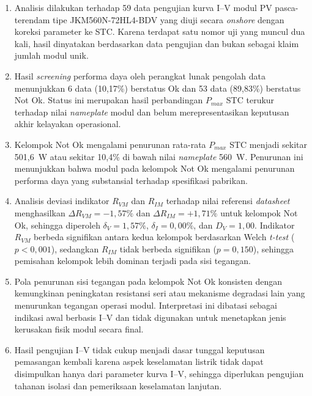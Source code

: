 \begin{enumerate}
    \item Analisis dilakukan terhadap 59 data pengujian kurva I--V modul PV
          pasca-terendam tipe JKM560N-72HL4-BDV yang diuji secara
          \textit{onshore} dengan koreksi parameter ke STC. Karena terdapat
          satu nomor uji yang muncul dua kali, hasil dinyatakan berdasarkan
          data pengujian dan bukan sebagai klaim jumlah modul unik.

    \item Hasil \textit{screening} performa daya oleh perangkat lunak pengolah
          data menunjukkan 6 data (10,17\%) berstatus Ok dan 53 data (89,83\%)
          berstatus Not Ok. Status ini merupakan hasil perbandingan $P_{max}$
          STC terukur terhadap nilai \textit{nameplate} modul dan belum
          merepresentasikan keputusan akhir kelayakan operasional.

    \item Kelompok Not Ok mengalami penurunan rata-rata $P_{max}$ STC menjadi
          sekitar 501,6~W atau sekitar 10,4\% di bawah nilai \textit{nameplate}
          560~W. Penurunan ini menunjukkan bahwa modul pada kelompok Not Ok
          mengalami penurunan performa daya yang substansial terhadap
          spesifikasi pabrikan.

    \item Analisis deviasi indikator $R_{VM}$ dan $R_{IM}$ terhadap nilai
          referensi \textit{datasheet} menghasilkan $\Delta R_{VM} = -1{,}57\%$
          dan $\Delta R_{IM} = +1{,}71\%$ untuk kelompok Not Ok, sehingga
          diperoleh $\delta_V = 1{,}57\%$, $\delta_I = 0{,}00\%$, dan
          $D_V = 1{,}00$. Indikator $R_{VM}$ berbeda signifikan antara kedua
          kelompok berdasarkan Welch \textit{t-test} ($p < 0{,}001$), sedangkan
          $R_{IM}$ tidak berbeda signifikan ($p = 0{,}150$), sehingga pemisahan
          kelompok lebih dominan terjadi pada sisi tegangan.

    \item Pola penurunan sisi tegangan pada kelompok Not Ok konsisten dengan
          kemungkinan peningkatan resistansi seri atau mekanisme degradasi lain
          yang menurunkan tegangan operasi modul. Interpretasi ini dibatasi
          sebagai indikasi awal berbasis I--V dan tidak digunakan untuk
          menetapkan jenis kerusakan fisik modul secara final.

    \item Hasil pengujian I--V tidak cukup menjadi dasar tunggal keputusan
          pemasangan kembali karena aspek keselamatan listrik tidak dapat
          disimpulkan hanya dari parameter kurva I--V, sehingga diperlukan
          pengujian tahanan isolasi dan pemeriksaan keselamatan lanjutan.
\end{enumerate}

